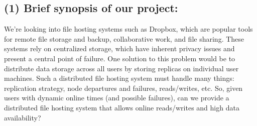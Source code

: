 \subsection{(1) Brief synopsis of our project:}
We're looking into file hosting systems such as Dropbox, which are popular tools for remote file storage and backup, collaborative work, and file sharing.
These systems rely on centralized storage, which have inherent privacy issues and present a central point of failure.
One solution to this problem would be to distribute data storage across all users by storing replicas on individual user machines.
Such a distributed file hosting system must handle many things: replication strategy, node departures and failures, reads/writes, etc.
So, given users with dynamic online times (and possible failures), can we provide a distributed file hosting system that allows online reads/writes and high data availability?

